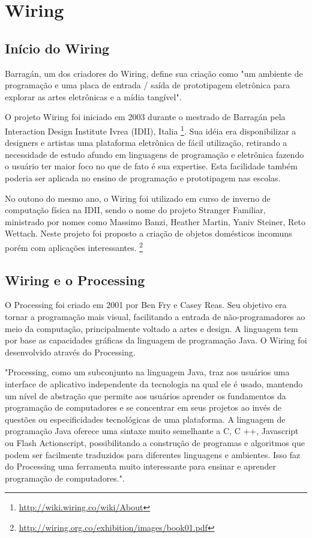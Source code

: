\section[Wiring]{Wiring}

\subsection{Início do Wiring}
Barragán, um dos criadores do Wiring, define sua criação como "um ambiente de programação e uma placa de entrada / saída de prototipagem eletrônica para explorar as artes eletrônicas e a mídia tangível"\cite{Barragan2004}.

O projeto Wiring foi iniciado em 2003 durante o mestrado de Barragán pela Interaction Design Institute Ivrea (IDII), Italia \footnote{\url{http://wiki.wiring.co/wiki/About}}. Sua idéia era disponibilizar a designers e artistas uma plataforma eletrônica de fácil utilização, retirando a necessidade de estudo afundo em linguagens de programação e eletrônica fazendo o usuário ter maior foco no que de fato é sua expertise. Esta facilidade também poderia ser aplicada no ensino de programação e prototipagem nas escolas.

No outono do mesmo ano, o Wiring foi utilizado em curso de inverno de computação física na IDII, sendo o nome do projeto Stranger Familiar, ministrado por nomes como Massimo Banzi, Heather Martin, Yaniv Steiner, Reto Wettach. Neste projeto foi proposto a criação de objetos domésticos incomuns porém com aplicações interessantes. \footnote{\url{http://wiring.org.co/exhibition/images/book01.pdf}}

\subsection{Wiring e o Processing}

O Processing foi criado em 2001 por Ben Fry e Casey Reas. Seu objetivo era tornar a programação mais visual, facilitando a entrada de não-programadores ao meio da computação, principalmente voltado a artes e design.\cite{reas2007processing} A linguagem tem por base as capacidades gráficas da linguagem de programação Java. O Wiring foi desenvolvido através do Processing.

"Processing, como um subconjunto na linguagem Java, traz aos usuários uma interface de aplicativo independente da tecnologia na qual ele é usado, mantendo um nível de abstração que permite aos usuários aprender os fundamentos da programação de computadores e se concentrar em seus projetos ao invés de questões ou especificidades tecnológicas de uma plataforma. A linguagem de programação Java oferece uma sintaxe muito semelhante a C, C ++, Javascript ou Flash Actionscript, possibilitando a construção de programas e algoritmos que podem ser facilmente traduzidos para diferentes linguagens e ambientes. Isso faz do Processing uma ferramenta muito interessante para ensinar e aprender programação de computadores."\cite{Barragan2004}.

